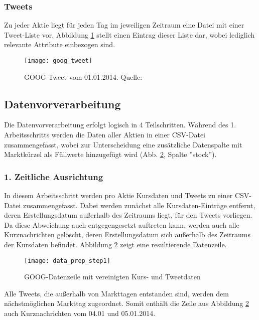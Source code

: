 \subsubsection*{Tweets}\label{sec:data_ingestion_tweetdata}
Zu jeder Aktie liegt für jeden Tag im jeweiligen Zeitraum eine Datei mit einer Tweet-Liste vor. Abbildung \ref{fig:goog_tweet} stellt einen Eintrag dieser Liste dar, wobei lediglich relevante Attribute einbezogen sind.
\begin{figure}[H]
	\texttt{[image: goog\_tweet]}
	\caption[GOOG Tweet vom 01.01.2014]{GOOG Tweet vom 01.01.2014. Quelle: \autocite{website:stocknet-dataset}}
	\label{fig:goog_tweet}
\end{figure}


\subsection{Datenvorverarbeitung}\label{sec:data_prep}

Die Datenvorverarbeitung erfolgt logisch in $4$ Teilschritten. Während des 1. Arbeitsschritts werden die Daten aller Aktien in einer \ac{CSV}-Datei zusammengefasst, wobei zur Unterscheidung eine zusätzliche Datenspalte mit Marktkürzel als Füllwerte hinzugefügt wird (Abb. \ref{fig:data_prep_step1}, Spalte ''stock'').

\subsubsection*{1. Zeitliche Ausrichtung}

In diesem Arbeitsschritt werden pro Aktie Kursdaten und Tweets zu einer \ac{CSV}-Datei zusammengefasst. Dabei werden zunächst alle Kursdaten-Einträge entfernt, deren Erstellungsdatum außerhalb des Zeitraums liegt, für den Tweets vorliegen. Da diese Abweichung auch entgegengesetzt auftreten kann, werden auch alle Kurznachrichten gelöscht, deren Erstellungsdatum sich außerhalb des Zeitraums der Kursdaten befindet. Abbildung \ref{fig:data_prep_step1} zeigt eine resultierende Datenzeile.
\begin{figure}[H]
	\texttt{[image: data\_prep\_step1]}
	\caption{GOOG-Datenzeile mit vereinigten Kurs- und Tweetdaten}
	\label{fig:data_prep_step1}
\end{figure}
Alle Tweets, die außerhalb von Markttagen entstanden sind, werden dem nächstmöglichen Markttag zugeordnet. Somit enthält die Zeile aus Abbildung \ref{fig:data_prep_step1} auch Kurznachrichten vom 04.01 und 05.01.2014. 


